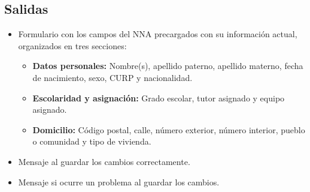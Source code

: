 
\subsection{Salidas}
\begin{itemize}
	\item Formulario con los campos del NNA precargados con su información actual, 
	organizados en tres secciones:
	\begin{itemize}
		\item \textbf{Datos personales:} Nombre(s), apellido paterno, apellido 
		materno, fecha de nacimiento, sexo, CURP y nacionalidad.
		\item \textbf{Escolaridad y asignación:} Grado escolar, tutor asignado 
		y equipo asignado.
		\item \textbf{Domicilio:} Código postal, calle, número exterior, número 
		interior, pueblo o comunidad y tipo de vivienda.
	\end{itemize}
	\item Mensaje  al guardar los 
	cambios correctamente.
	\item Mensaje  si ocurre un problema 
	al guardar los cambios.
\end{itemize}

